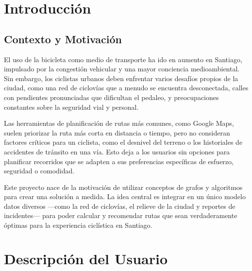\documentclass[12pt, a4paper, spanish]{article}
\begin{document}
\newpage

\section{Introducción}
\subsection{Contexto y Motivación}
El uso de la bicicleta como medio de transporte ha ido en aumento en Santiago, impulsado por la congestión vehicular y una mayor conciencia medioambiental. Sin embargo, los ciclistas urbanos deben enfrentar varios desafíos propios de la ciudad, como una red de ciclovías que a menudo se encuentra desconectada, calles con pendientes pronunciadas que dificultan el pedaleo, y preocupaciones constantes sobre la seguridad vial y personal.

Las herramientas de planificación de rutas más comunes, como Google Maps, suelen priorizar la ruta más corta en distancia o tiempo, pero no consideran factores críticos para un ciclista, como el desnivel del terreno o los historiales de accidentes de tránsito en una vía. Esto deja a los usuarios sin opciones para planificar recorridos que se adapten a sus preferencias específicas de esfuerzo, seguridad o comodidad.

Este proyecto nace de la motivación de utilizar conceptos de grafos y algoritmos para crear una solución a medida. La idea central es integrar en un único modelo datos diversos —como la red de ciclovías, el relieve de la ciudad y reportes de incidentes— para poder calcular y recomendar rutas que sean verdaderamente óptimas para la experiencia ciclística en Santiago.

\section{Descripción del Usuario}
\label{sec:usuario}
\end{document}
